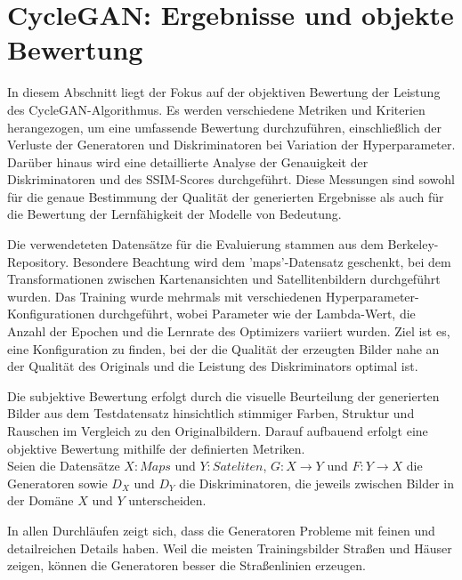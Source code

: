 \section{CycleGAN: Ergebnisse und objekte Bewertung}

In diesem Abschnitt liegt der Fokus auf der objektiven Bewertung der Leistung des CycleGAN-Algorithmus. Es werden verschiedene Metriken und Kriterien herangezogen, um eine umfassende Bewertung durchzuführen, einschließlich der Verluste der Generatoren und Diskriminatoren bei Variation der Hyperparameter. Darüber hinaus wird eine detaillierte Analyse der Genauigkeit der Diskriminatoren und des SSIM-Scores durchgeführt. Diese Messungen sind sowohl für die genaue Bestimmung der Qualität der generierten Ergebnisse als auch für die Bewertung der Lernfähigkeit der Modelle von Bedeutung.

Die verwendeteten Datensätze für die Evaluierung stammen aus dem Berkeley-Repository. Besondere Beachtung wird dem 'maps'-Datensatz geschenkt, bei dem Transformationen zwischen Kartenansichten und Satellitenbildern durchgeführt wurden. Das Training wurde mehrmals mit verschiedenen Hyperparameter-\\Konfigurationen durchgeführt, wobei Parameter wie der Lambda-Wert, die Anzahl der Epochen und die Lernrate des Optimizers variiert wurden. Ziel ist es, eine Konfiguration zu finden, bei der die Qualität der erzeugten Bilder nahe an der Qualität des Originals und die Leistung des Diskriminators optimal ist.

Die subjektive Bewertung erfolgt durch die visuelle Beurteilung der generierten Bilder aus dem Testdatensatz hinsichtlich stimmiger Farben, Struktur und Rauschen im Vergleich zu den Originalbildern. Darauf aufbauend erfolgt eine objektive Bewertung mithilfe der definierten Metriken.
\\\newline
Seien die Datensätze $X: Maps$ und $Y: Sateliten$, $G: X\rightarrow Y$ und $F: Y\rightarrow X$ die Generatoren sowie $D_X$ und $D_Y$ die Diskriminatoren, die jeweils zwischen Bilder in der Domäne $X$ und $Y$ unterscheiden. 
\\\newline

In allen Durchläufen zeigt sich, dass die Generatoren Probleme mit feinen und detailreichen Details haben. Weil die meisten Trainingsbilder Straßen und Häuser zeigen, können die Generatoren besser die Straßenlinien erzeugen.

